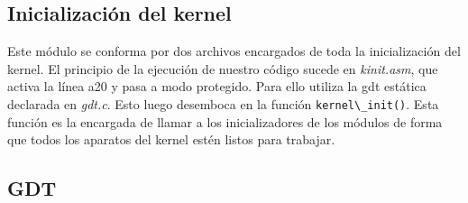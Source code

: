 \documentclass[a4paper]{article}
\newcommand{\file}[1]{\textit{#1}}
\newcommand{\func}[1]{\lstinline{#1}}
\begin{document}


\subsection{Inicialización del kernel}

Este módulo se conforma por dos archivos encargados de toda la inicialización del kernel. El principio de la ejecución de nuestro código sucede en \file{kinit.asm}, que activa la línea a20 y pasa a modo protegido. Para ello utiliza la gdt estática declarada en \file{gdt.c}. Esto luego desemboca en la función \func{kernel\_init()}. Esta función es la encargada de llamar a los inicializadores de los módulos de forma que todos los aparatos del kernel estén listos para trabajar.

\subsection{GDT}
\end{document}

